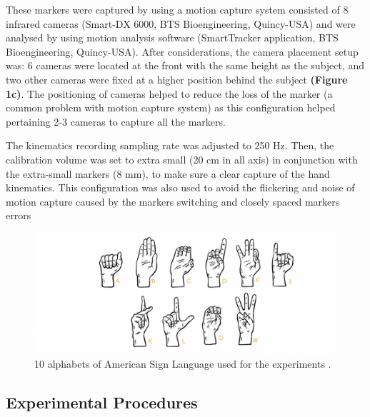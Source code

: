 \documentclass[conference]{IEEEtran}
\begin{document}
These markers were captured by using a motion capture system consisted of 8 infrared cameras (Smart-DX 6000, BTS Bioengineering, Quincy-USA) and were analysed by using motion analysis software
(SmartTracker application, BTS Bioengineering, Quincy-USA). After considerations, the camera placement 
setup was: 6 cameras were located at the front with the same height as the subject, and two other cameras 
were fixed at a higher position behind the subject \textbf{(Figure 1c)}. The positioning of cameras helped to reduce 
the loss of the marker (a common problem with motion capture system) as this configuration helped 
pertaining 2-3 cameras to capture all the markers.

The kinematics recording sampling rate was adjusted to 250 Hz. Then, the calibration volume was set 
to extra small (20 cm in all axis) in conjunction with the extra-small markers (8 mm), to make sure a clear 
capture of the hand kinematics. This configuration was also used to avoid the flickering and noise of motion 
capture caused by the markers switching and closely spaced markers errors

\begin{figure}[htbp]
\centerline{\includegraphics[width=\columnwidth]{figure2.png}}
\caption{10 alphabets of American Sign Language used for the experiments \cite{b26}.}
\label{figure2}
\end{figure}

\subsection{Experimental Procedures}
\end{document}
